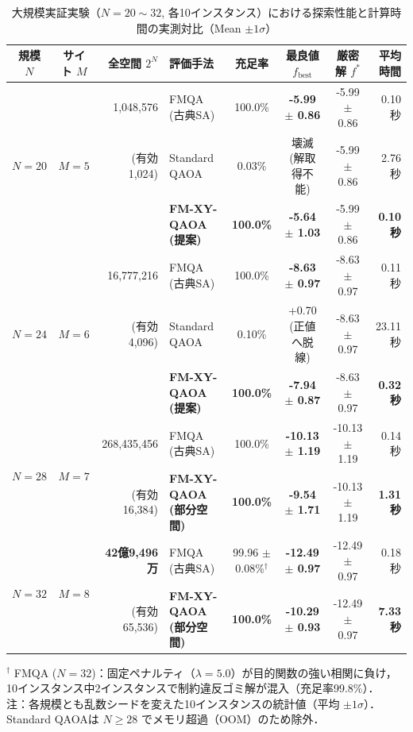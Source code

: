\documentclass[11pt,a4paper]{ltjsarticle}
\begin{document}
\begin{table}[H]
\centering
\caption{大規模実証実験（$N=20 \sim 32$, 各10インスタンス）における探索性能と計算時間の実測対比（Mean $\pm 1\sigma$）}\label{tab:benchmark_n20_n32}
\vspace{1mm}
\footnotesize
\setlength{\tabcolsep}{3.0pt}
\renewcommand{\arraystretch}{1.2}
\begin{tabular}{c c r l c c c r}
\toprule
\textbf{規模 $N$} & \textbf{サイト $M$} & \textbf{全空間 $2^N$} & \textbf{評価手法} & \textbf{充足率} & \textbf{最良値 $f_{\mathrm{best}}$} & \textbf{厳密解 $f^*$} & \textbf{平均時間} \\
\midrule
\multirow{3}{*}{$N=20$} & \multirow{3}{*}{$M=5$} & 1,048,576 & FMQA (古典SA) & 100.0\% & \textbf{-5.99 $\pm$ 0.86} & -5.99 $\pm$ 0.86 & 0.10 秒 \\
& & (有効 1,024) & Standard QAOA & 0.03\% & 壊滅 (解取得不能) & -5.99 $\pm$ 0.86 & 2.76 秒 \\
& & & \textbf{FM-XY-QAOA (提案)} & \textbf{100.0\%} & \textbf{-5.64 $\pm$ 1.03} & -5.99 $\pm$ 0.86 & \textbf{0.10 秒} \\
\midrule
\multirow{3}{*}{$N=24$} & \multirow{3}{*}{$M=6$} & 16,777,216 & FMQA (古典SA) & 100.0\% & \textbf{-8.63 $\pm$ 0.97} & -8.63 $\pm$ 0.97 & 0.11 秒 \\
& & (有効 4,096) & Standard QAOA & 0.10\% & +0.70 (正値へ脱線) & -8.63 $\pm$ 0.97 & 23.11 秒 \\
& & & \textbf{FM-XY-QAOA (提案)} & \textbf{100.0\%} & \textbf{-7.94 $\pm$ 0.87} & -8.63 $\pm$ 0.97 & \textbf{0.32 秒} \\
\midrule
\multirow{2}{*}{$N=28$} & \multirow{2}{*}{$M=7$} & 268,435,456 & FMQA (古典SA) & 100.0\% & \textbf{-10.13 $\pm$ 1.19} & -10.13 $\pm$ 1.19 & 0.14 秒 \\
& & (有効 16,384) & \textbf{FM-XY-QAOA (部分空間)} & \textbf{100.0\%} & \textbf{-9.54 $\pm$ 1.71} & -10.13 $\pm$ 1.19 & \textbf{1.31 秒} \\
\midrule
\multirow{2}{*}{$N=32$} & \multirow{2}{*}{$M=8$} & \textbf{42億9,496万} & FMQA (古典SA) & 99.96 $\pm$ 0.08\%$^\dagger$ & \textbf{-12.49 $\pm$ 0.97} & -12.49 $\pm$ 0.97 & 0.18 秒 \\
& & (有効 65,536) & \textbf{FM-XY-QAOA (部分空間)} & \textbf{100.0\%} & \textbf{-10.29 $\pm$ 0.93} & -12.49 $\pm$ 0.97 & \textbf{7.33 秒} \\
\bottomrule
\end{tabular}
\vspace{1.5mm}
\parbox{\linewidth}{\scriptsize
$^\dagger$ FMQA ($N=32$)：固定ペナルティ（$\lambda=5.0$）が目的関数の強い相関に負け，10インスタンス中2インスタンスで制約違反ゴミ解が混入（充足率99.8\%）．\\
注：各規模とも乱数シードを変えた10インスタンスの統計値（平均 $\pm 1\sigma$）．Standard QAOAは $N \ge 28$ でメモリ超過（OOM）のため除外．
}
\end{table}
\end{document}
